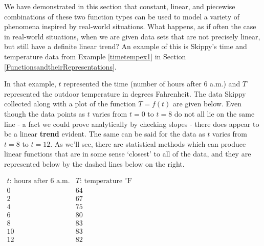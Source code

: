 \documentclass{ximera}
\begin{document}
	\author{Stitz-Zeager}
\begin{abstract}
\end{abstract}
\label{LinearRegression}
 
We have demonstrated in this section that constant, linear, and piecewise combinations of these two function types can be used to model a variety of phenomena inspired by real-world situations.  What happens, as if often the case in real-world situations, when we are given data sets that are not precisely linear, but still have a definite linear trend?  An example of this is Skippy's  time and temperature data from Example \ref{timetempex1} in Section \ref{FunctionsandtheirRepresentations}. 



In that example, $t$ represented the time (number of hours after 6 a.m.) and $T$ represented the outdoor temperature in degrees Fahrenheit. The data Skippy collected along with a plot of the function $T = f(t)$ are given below. Even though the data points as $t$ varies from $t = 0$ to $t = 8$ do not all lie on the same line - a fact we could prove analytically by checking slopes - there does appear to be a linear \textbf{trend} evident.  The same can be said for the data as $t$ varies from $t =8 $ to $t = 12$.  As we'll see, there are statistical methods which can produce  linear functions that are in some sense `closest' to all of the data, and they are represented below by the dashed lines below on the right. 

\begin{center}
$\begin{array}{|c||c|}  \hline

 \text{$t$: hours after 6 a.m.}  & \text{$T$: temperature $^{\circ}$F} \\ \hline
 0 & 64  \\
 2 & 67  \\
 4 &  75  \\
 6 &  80 \\
 8 & 83  \\
 10 &  83 \\
 12 & 82  \\
\end{array}$
\end{center}

\begin{center}
\end{center}
\end{document}
